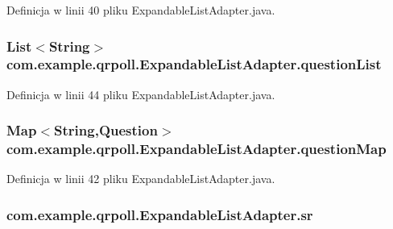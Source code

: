 Definicja w linii 40 pliku Expandable\+List\+Adapter.\+java.

\hypertarget{classcom_1_1example_1_1qrpoll_1_1_expandable_list_adapter_a21519cda6be88f0b729afc1ac0cc06a5}{
\subsubsection[{question\+List}]{\setlength{\rightskip}{0pt plus 5cm}List$<$String$>$ com.\+example.\+qrpoll.\+Expandable\+List\+Adapter.\+question\+List\hspace{0.3cm}{\ttfamily [private]}}}\label{classcom_1_1example_1_1qrpoll_1_1_expandable_list_adapter_a21519cda6be88f0b729afc1ac0cc06a5}


Definicja w linii 44 pliku Expandable\+List\+Adapter.\+java.

\hypertarget{classcom_1_1example_1_1qrpoll_1_1_expandable_list_adapter_a5ec37e3c4af51739b2c0cd282b9bf208}{
\subsubsection[{question\+Map}]{\setlength{\rightskip}{0pt plus 5cm}Map$<$String,{\bf Question}$>$ com.\+example.\+qrpoll.\+Expandable\+List\+Adapter.\+question\+Map\hspace{0.3cm}{\ttfamily [private]}}}\label{classcom_1_1example_1_1qrpoll_1_1_expandable_list_adapter_a5ec37e3c4af51739b2c0cd282b9bf208}


Definicja w linii 42 pliku Expandable\+List\+Adapter.\+java.

\hypertarget{classcom_1_1example_1_1qrpoll_1_1_expandable_list_adapter_a5a2a5fcc6055e9df94314c040efeca1f}{
\subsubsection[{sr}]{ com.\+example.\+qrpoll.\+Expandable\+List\+Adapter.\+sr}}\label{classcom_1_1example_1_1qrpoll_1_1_expandable_list_adapter_a5a2a5fcc6055e9df94314c040efeca1f}



